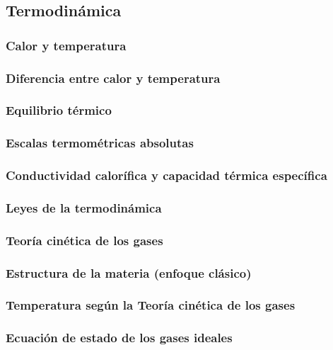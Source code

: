 \subsection{Termodinámica}
\subsubsection{Calor y temperatura}
\subsubsection{Diferencia entre calor y temperatura}
\subsubsection{Equilibrio térmico}
\subsubsection{Escalas termométricas absolutas}
\subsubsection{Conductividad calorífica y capacidad térmica específica}
\subsubsection{Leyes de la termodinámica}
\subsubsection{Teoría cinética de los gases}
\subsubsection{Estructura de la materia (enfoque clásico)}
\subsubsection{Temperatura según la Teoría cinética de los gases}
\subsubsection{Ecuación de estado de los gases ideales}
